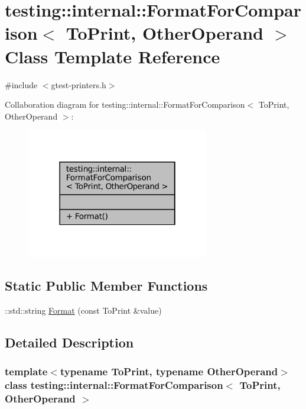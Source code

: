 \hypertarget{classtesting_1_1internal_1_1FormatForComparison}{}\section{testing\+:\+:internal\+:\+:Format\+For\+Comparison$<$ To\+Print, Other\+Operand $>$ Class Template Reference}
\label{classtesting_1_1internal_1_1FormatForComparison}


{\ttfamily \#include $<$gtest-\/printers.\+h$>$}



Collaboration diagram for testing\+:\+:internal\+:\+:Format\+For\+Comparison$<$ To\+Print, Other\+Operand $>$\+:
\nopagebreak
\begin{figure}[H]
\begin{center}
\leavevmode
\includegraphics[width=226pt]{classtesting_1_1internal_1_1FormatForComparison__coll__graph}
\end{center}
\end{figure}
\subsection*{Static Public Member Functions}
\begin{DoxyCompactItemize}
\item 
\+::std\+::string \hyperlink{classtesting_1_1internal_1_1FormatForComparison_a2aeb688fc55b57abd3021d82eccad896}{Format} (const To\+Print \&value)
\end{DoxyCompactItemize}


\subsection{Detailed Description}
\subsubsection*{template$<$typename To\+Print, typename Other\+Operand$>$\newline
class testing\+::internal\+::\+Format\+For\+Comparison$<$ To\+Print, Other\+Operand $>$}



